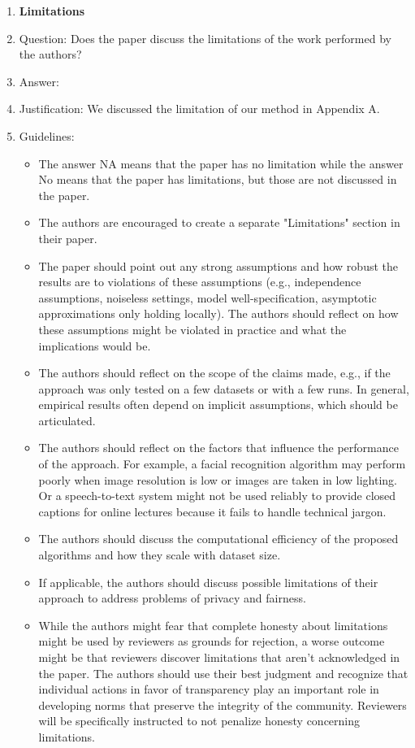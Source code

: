 \documentclass{article}
\begin{document}
\begin{enumerate}
\item {\bf Limitations}
    \item[] Question: Does the paper discuss the limitations of the work performed by the authors?
    \item[] Answer: \answerYes{} %
    \item[] Justification: We discussed the limitation of our method in Appendix A.
    \item[] Guidelines:
    \begin{itemize}
        \item The answer NA means that the paper has no limitation while the answer No means that the paper has limitations, but those are not discussed in the paper. 
        \item The authors are encouraged to create a separate "Limitations" section in their paper.
        \item The paper should point out any strong assumptions and how robust the results are to violations of these assumptions (e.g., independence assumptions, noiseless settings, model well-specification, asymptotic approximations only holding locally). The authors should reflect on how these assumptions might be violated in practice and what the implications would be.
        \item The authors should reflect on the scope of the claims made, e.g., if the approach was only tested on a few datasets or with a few runs. In general, empirical results often depend on implicit assumptions, which should be articulated.
        \item The authors should reflect on the factors that influence the performance of the approach. For example, a facial recognition algorithm may perform poorly when image resolution is low or images are taken in low lighting. Or a speech-to-text system might not be used reliably to provide closed captions for online lectures because it fails to handle technical jargon.
        \item The authors should discuss the computational efficiency of the proposed algorithms and how they scale with dataset size.
        \item If applicable, the authors should discuss possible limitations of their approach to address problems of privacy and fairness.
        \item While the authors might fear that complete honesty about limitations might be used by reviewers as grounds for rejection, a worse outcome might be that reviewers discover limitations that aren't acknowledged in the paper. The authors should use their best judgment and recognize that individual actions in favor of transparency play an important role in developing norms that preserve the integrity of the community. Reviewers will be specifically instructed to not penalize honesty concerning limitations.
    \end{itemize}


\end{enumerate}
\end{document}
